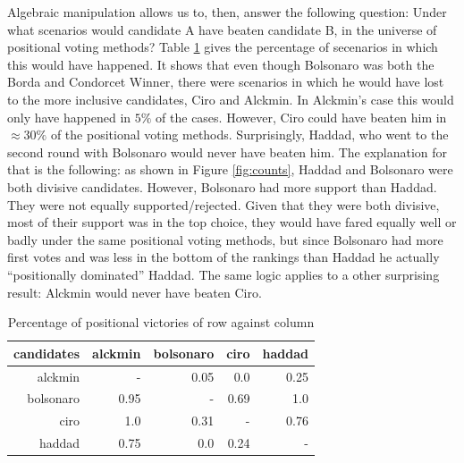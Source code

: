 \documentclass[hidelinks,11pt]{article}
\begin{document}
Algebraic manipulation allows us to, then, answer the following question: Under what scenarios would candidate A have beaten candidate B, in the universe of positional voting methods? Table \ref{tab:percentage} gives the percentage of secenarios in which this would have happened. It shows that even though Bolsonaro was both the Borda and Condorcet Winner, there were scenarios in which he would have lost to the more inclusive candidates, Ciro and Alckmin. In Alckmin's case this would only have happened in \(5\%\) of the cases. However, Ciro could have beaten him in \(\approx 30\%\) of the positional voting methods. Surprisingly, Haddad, who went to the second round with Bolsonaro would never have beaten him. The explanation for that is the following: as shown in Figure \ref{fig:counts}, Haddad and Bolsonaro were both divisive candidates. However, Bolsonaro had more support than Haddad. They were not equally supported/rejected. Given that they were both divisive, most of their support was in the top choice, they would have fared equally well or badly under the same positional voting methods, but since Bolsonaro had more first votes and was less in the bottom of the rankings than Haddad he actually ``positionally dominated'' Haddad. The same logic applies to a other surprising result: Alckmin would never have beaten Ciro.


\begin{table}[]
  \centering
\begin{tabular}{|r|r|r|r|r|}
\hline
\textbf{candidates} & \textbf{alckmin} & \textbf{bolsonaro} & \textbf{ciro} & \textbf{haddad} \\ \hline
alckmin             & -             & 0.05               & 0.0           & 0.25            \\ \hline
bolsonaro           & 0.95             & -            & 0.69          & 1.0             \\ \hline
ciro                & 1.0              & 0.31               & -           & 0.76            \\ \hline
haddad              & 0.75             & 0.0                & 0.24          & -            \\ \hline
\end{tabular}
\caption{Percentage of positional victories of row against column}
\label{tab:percentage}
\end{table}
\end{document}
